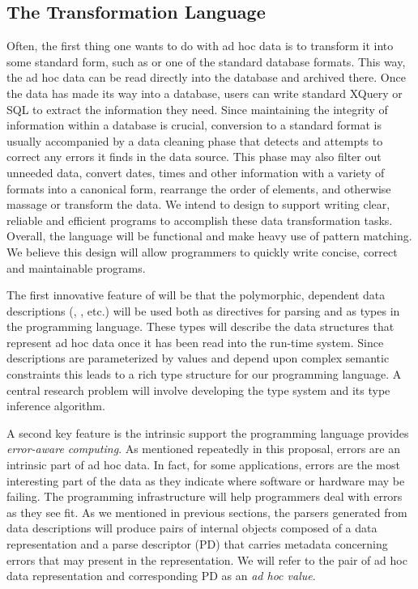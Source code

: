 \documentclass[11pt]{article}
\begin{document}
\subsection{The \datatype{} Transformation Language}
\label{sec:language}

Often, the first thing one wants to do with ad hoc data 
is to transform it into some standard form, such as \xml{}
or one of the standard database formats.  This way,
the ad hoc data can be read directly into the database
and archived there.  Once the data has made its way into a database, 
users can write standard XQuery or SQL to extract the information 
they need.  Since maintaining the integrity of information
within a database is crucial, conversion to a standard format
is usually accompanied by a data cleaning phase that detects
and attempts to correct any errors it finds in the data source.
This phase may also filter out unneeded data, convert dates,
times and other information with a variety of formats into
a canonical form, rearrange the order of elements,
and otherwise massage or transform the data.
We intend to design \datatype{} 
to support writing clear, reliable and efficient programs to
accomplish these data transformation tasks.
Overall, the language will be functional and make
heavy use of pattern matching.  We believe this design will
allow programmers to quickly write concise, correct and maintainable
programs.  

The first innovative feature of \datatype{} will be
that the polymorphic, dependent
data descriptions (, , etc.)
will be used both as directives for parsing and
as types in the programming language.  These
types will describe the data structures that represent
ad hoc data once it has been
read into the run-time system.  Since \datatype{} descriptions
are parameterized by values and depend upon complex semantic constraints
this leads to a rich type structure for our programming language.
A central research problem will involve developing the type system
and its type inference algorithm.

A second key feature is the intrinsic support the programming language provides
{\em error-aware computing}.  As mentioned repeatedly in this proposal,
errors are an intrinsic part of ad hoc data.  In fact, for some 
applications, errors are the most interesting part of the data 
as they indicate where software or
hardware may be failing.  The \datatype{} programming infrastructure
will help programmers deal with errors as they see fit.
As we mentioned in previous
sections, the parsers generated from \datatype{} data descriptions
will produce pairs of internal objects composed of
a data representation and a parse descriptor (PD)
that carries metadata concerning errors that may present in the 
representation.
We will refer to the pair of ad hoc data representation and corresponding PD
as an {\em ad hoc value}.
\end{document}
